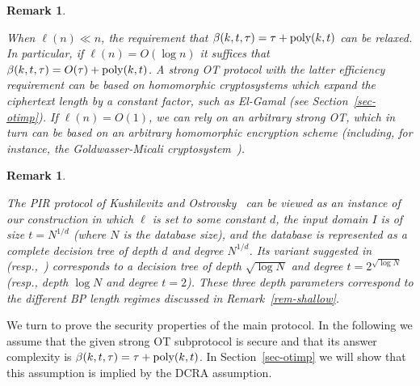 \documentclass[11pt]{article}
\newtheorem{Remark}[theorem]{Remark}
\newenvironment{remark}{\begin{Remark}\begin{rm}}{\end{rm}\end{Remark}}
\newcommand{\poly}{{\mbox{\rm poly}}}
\newcommand{\otl}{{\tau}}
\begin{document}
\begin{remark}
\label{rem-shallow}
 When $\ell(n)\ll n$, the requirement that
$\beta(k,t,\otl)=\otl+\poly(k,t)$ can be relaxed. In particular, if
$\ell(n)=O(\log n)$ it suffices that
$\beta(k,t,\otl)=O(\otl)+\poly(k,t)$. A strong OT protocol with the
latter efficiency requirement can be based on homomorphic
cryptosystems which expand the ciphertext length by a constant
factor, such as El-Gamal (see Section~\ref{sec-otimp}). If
$\ell(n)=O(1)$, we can rely on an arbitrary strong OT, which in
turn can be based on an arbitrary homomorphic encryption scheme
(including, for instance, the Goldwasser-Micali
cryptosystem~\cite{GM}).
\end{remark}

\begin{remark}
The PIR protocol of Kushilevitz and Ostrovsky~\cite{KO97} can be
viewed as an instance of our construction in which $\ell$ is set to
some constant $d$, the input domain $I$ is of size $t=N^{1/d}$
(where $N$ is the database size), and the database is represented
as a complete decision tree of depth $d$ and degree $N^{1/d}$. Its
variant suggested in~\cite{Ste98} (resp.,~\cite{L04}) corresponds
to a decision tree of depth $\sqrt{\log N}$ and degree
$t=2^{\sqrt{\log N}}$ (resp., depth $\log N$ and degree $t=2$).
These three depth parameters correspond to the different BP length
regimes discussed in Remark~\ref{rem-shallow}.
\end{remark}

We turn to prove the security properties of the main protocol. In
the following we assume that the given strong OT subprotocol is
secure and that its answer complexity is
$\beta(k,t,\otl)=\otl+\poly(k,t)$. In Section~\ref{sec-otimp} we
will show that this assumption is implied by the DCRA assumption.
\end{document}
